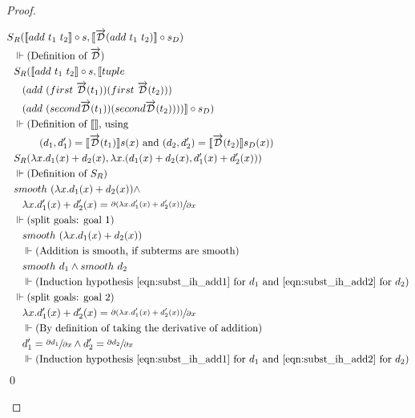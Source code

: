 \documentclass[11pt, final]{article}
\begin{document}
\begin{proof}
\begin{enumerate}
      \begin{align*}
        S&_R(\llbracket add\ t_1\ t_2 \rrbracket \circ s, \llbracket \overrightarrow{\mathcal{D}}(add\ t_1\ t_2) \rrbracket \circ s_D) \\
        &\Vdash \text{(Definition of $\overrightarrow{\mathcal{D}}$)}\\
        &S_R(\llbracket add\ t_1\ t_2 \rrbracket \circ s, \llbracket tuple\ \\
        & \;\;\;(add\ (first\ \overrightarrow{\mathcal{D}}(t_1)) (first\ \overrightarrow{\mathcal{D}}(t_2)))\ \\
        & \;\;\;(add\ (second \overrightarrow{\mathcal{D}}(t_1)) (second \overrightarrow{\mathcal{D}}(t_2)))) \rrbracket \circ s_D) \\
        &\Vdash \text{(Definition of $\llbracket\rrbracket$, using} \\
        & \;\;\;\;\;\;\;\;\; \text{$(d_1, d_1') = \llbracket \overrightarrow{\mathcal{D}}(t_1) \rrbracket s(x)$ and $(d_2, d_2') = \llbracket \overrightarrow{\mathcal{D}}(t_2) \rrbracket s_D(x)$)}\\
        &S_R(\lambda x. d_1(x) + d_2(x), \lambda x. (d_1(x) + d_2(x), d_1'(x) + d_2'(x))) \\
        &\Vdash \text{(Definition of $S_R$)}\\
        & smooth\ (\lambda x. d_1(x) + d_2(x)) \wedge \\
        & \;\;\; \lambda x. d_1'(x) + d_2'(x) = \sfrac{\partial{(\lambda x. d_1'(x) + d_2'(x))}}{\partial{x}} \\
        &\Vdash \text{(split goals: goal 1)}\\
        &\;\;\;smooth\ (\lambda x. d_1(x) + d_2(x)) \\
        &\;\;\;\Vdash
          \text{(Addition is smooth, if subterms are smooth)}\\
        &\;\;\;smooth\ d_1 \wedge smooth\ d_2 \\
        &\;\;\;\Vdash \text{(Induction hypothesis \ref{eqn:subst_ih_add1} for $d_1$ and \ref{eqn:subst_ih_add2} for $d_2$)}\\
        &\Vdash \text{(split goals: goal 2)}\\
        &\;\;\;\lambda x. d_1'(x) + d_2'(x) = \sfrac{\partial{(\lambda x. d_1'(x) + d_2'(x))}}{\partial{x}} \\
        &\;\;\;\Vdash \text{(By definition of taking the derivative of addition)} \\
        &\;\;\; d_1' = \sfrac{\partial{d_1}}{\partial{x}} \wedge d_2' = \sfrac{\partial{d_2}}{\partial{x}} \\
        &\;\;\;\Vdash \text{(Induction hypothesis \ref{eqn:subst_ih_add1} for $d_1$ and \ref{eqn:subst_ih_add2} for $d_2$)}\\
      \end{align*} \qed


\end{enumerate}
\end{proof}
\end{document}
